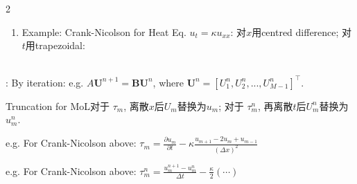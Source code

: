\documentclass{note}
\begin{document}
\begin{multicols}{2}
{{\begin{MyTh}{}
\begin{enumerate}
            \vspace{-2pt}
            \item Example: Crank-Nicolson for Heat Eq. $u_t=\kappa u_{xx}$: 对$x$用centred difference; 对$t$用trapezoidal:
             \\
             \\
        \end{enumerate}

        \vspace{-4pt}
        \quad {}: By iteration: e.g. $A\mathbf{U}^{n+1}=\mathbf{B}\mathbf{U}^n$, \quad where $\mathbf{U}^n=[U_1^n,U_2^n,...,U_{M-1}^n]^\top$.
    \end{MyTh}

    \begin{MyTh}{Truncation for MoL}\tiny 对于 ${\tau}_m$, 离散$x$后$U_m$替换为$u_m$; 对于 $\tau_m^n$, 再离散$t$后$U_m^n$替换为$u_m^n$.

        \vspace{1pt}
        \quad e.g. For Crank-Nicolson above: $\tau_m = \frac{\partial u_m}{\partial t} - \kappa \frac{u_{m+1}-2u_m+u_{m-1}}{(\Delta x)^2}$

        \vspace{-2pt}
        \quad e.g. For Crank-Nicolson above: $\tau_m^n = \frac{u_m^{n+1}-u_m^n}{\Delta t} - \frac{\kappa}{2}(\cdots)$
    \end{MyTh}

    }}

\end{multicols}
\end{document}
